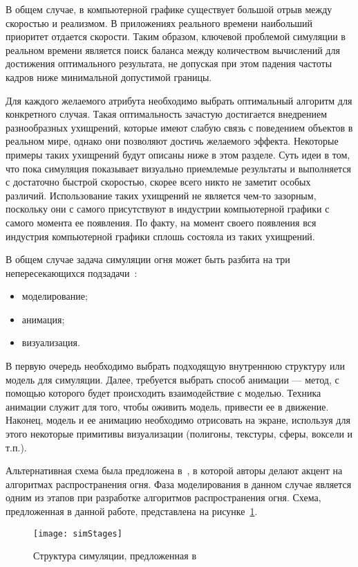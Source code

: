 В общем случае, в компьютерной графике существует большой отрыв между скоростью
и реализмом. В приложениях реального времени наибольший приоритет отдается
скорости. Таким образом, ключевой проблемой симуляции в реальном времени
является поиск баланса между количеством вычислений для достижения оптимального
результата, не допуская при этом падения частоты кадров ниже минимальной
допустимой границы.

Для каждого желаемого атрибута необходимо выбрать оптимальный алгоритм для
конкретного случая. Такая оптимальность зачастую достигается внедрением
разнообразных ухищрений, которые имеют слабую связь с поведением объектов в
реальном мире, однако они позволяют достичь желаемого эффекта. Некоторые примеры
таких ухищрений будут описаны ниже в этом разделе. Суть идеи в том, что пока
симуляция показывает визуально приемлемые результаты и выполняется с достаточно
быстрой скоростью, скорее всего никто не заметит особых различий. Использование
таких ухищрений не является чем-то зазорным, поскольку они с самого присутствуют
в индустрии компьютерной графики с самого момента ее появления. По факту, на
момент своего появления вся индустрия компьютерной графики сплошь состояла из
таких ухищрений.

В общем случае задача симуляции огня может быть разбита на три
непересекающихся подзадачи~\cite{Perry94synthesizingflames}:
\begin{itemize}
	\item моделирование;
	\item анимация;
	\item визуализация.
\end{itemize}

В первую очередь необходимо выбрать подходящую внутреннюю структуру или модель
для симуляции. Далее, требуется выбрать способ анимации --- метод, с помощью
которого будет происходить взаимодействие с моделью. Техника анимации служит для
того, чтобы оживить модель, привести ее в движение. Наконец, модель и ее
анимацию необходимо отрисовать на экране, используя для этого некоторые
примитивы визуализации (полигоны, текстуры, сферы, воксели и т.п.).

Альтернативная схема была предложена в~\cite{realistic_sim}, в которой авторы
делают акцент на алгоритмах распространения огня. Фаза моделирования в данном
случае является одним из этапов при разработке алгоритмов распространения
огня. Схема, предложенная в данной работе, представлена на
рисунке~\ref{fig:simStages}.

\begin{figure}[htb]
	\centering
    \texttt{[image: simStages]}
    \caption{Структура симуляции, предложенная в~\cite{realistic_sim}}%
    \label{fig:simStages}
\end{figure}

